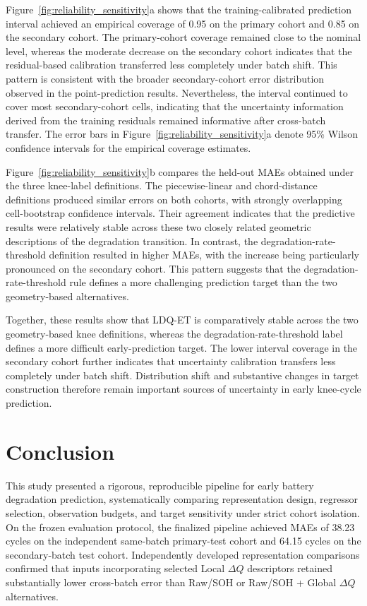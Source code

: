 \documentclass[pdflatex,sn-mathphys-num]{sn-jnl}
\begin{document}
Figure~\ref{fig:reliability_sensitivity}a shows that the training-calibrated prediction interval achieved an empirical coverage of 0.95 on the primary cohort and 0.85 on the secondary cohort. The primary-cohort coverage remained close to the nominal level, whereas the moderate decrease on the secondary cohort indicates that the residual-based calibration transferred less completely under batch shift. This pattern is consistent with the broader secondary-cohort error distribution observed in the point-prediction results. Nevertheless, the interval continued to cover most secondary-cohort cells, indicating that the uncertainty information derived from the training residuals remained informative after cross-batch transfer. The error bars in Figure~\ref{fig:reliability_sensitivity}a denote 95\% Wilson confidence intervals for the empirical coverage estimates.

Figure~\ref{fig:reliability_sensitivity}b compares the held-out MAEs obtained under the three knee-label definitions. The piecewise-linear and chord-distance definitions produced similar errors on both cohorts, with strongly overlapping cell-bootstrap confidence intervals. Their agreement indicates that the predictive results were relatively stable across these two closely related geometric descriptions of the degradation transition. In contrast, the degradation-rate-threshold definition resulted in higher MAEs, with the increase being particularly pronounced on the secondary cohort. This pattern suggests that the degradation-rate-threshold rule defines a more challenging prediction target than the two geometry-based alternatives.

Together, these results show that LDQ-ET is comparatively stable across the two geometry-based knee definitions, whereas the degradation-rate-threshold label defines a more difficult early-prediction target. The lower interval coverage in the secondary cohort further indicates that uncertainty calibration transfers less completely under batch shift. Distribution shift and substantive changes in target construction therefore remain important sources of uncertainty in early knee-cycle prediction.

\FloatBarrier

\section{Conclusion}
\label{sec:conclusion}

This study presented a rigorous, reproducible pipeline for early battery degradation prediction, systematically comparing representation design, regressor selection, observation budgets, and target sensitivity under strict cohort isolation. On the frozen evaluation protocol, the finalized pipeline achieved MAEs of 38.23 cycles on the independent same-batch primary-test cohort and 64.15 cycles on the secondary-batch test cohort. Independently developed representation comparisons confirmed that inputs incorporating selected Local $\Delta Q$ descriptors retained substantially lower cross-batch error than Raw/SOH or Raw/SOH + Global $\Delta Q$ alternatives.
\end{document}
